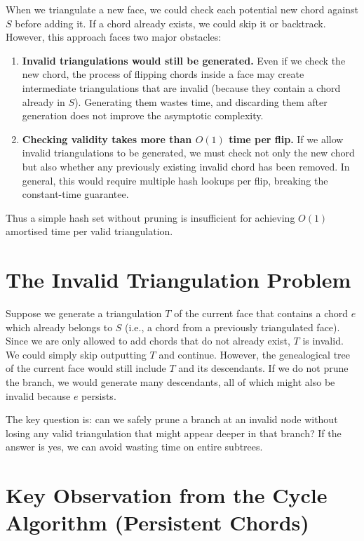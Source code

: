When we triangulate a new face, we could check each potential new chord against \(S\) before adding it. 
If a chord already exists, we could skip it or backtrack. 
However, this approach faces two major obstacles:

\begin{enumerate}
    \item \textbf{Invalid triangulations would still be generated.} 
    Even if we check the new chord, the process of flipping chords inside a face may create intermediate triangulations that are invalid (because they contain a chord already in \(S\)). 
    Generating them wastes time, and discarding them after generation does not improve the asymptotic complexity.
    
    \item \textbf{Checking validity takes more than \(O(1)\) time per flip.} 
    If we allow invalid triangulations to be generated, we must check not only the new chord but also whether any previously existing invalid chord has been removed. 
    In general, this would require multiple hash lookups per flip, breaking the constant-time guarantee.
\end{enumerate}

Thus a simple hash set without pruning is insufficient for achieving \(O(1)\) amortised time per valid triangulation.

\section{The Invalid Triangulation Problem}
\label{sec:invalid_problem}

Suppose we generate a triangulation \(T\) of the current face that contains a chord \(e\) which already belongs to \(S\) (i.e., a chord from a previously triangulated face). 
Since we are only allowed to add chords that do not already exist, \(T\) is invalid. 
We could simply skip outputting \(T\) and continue. 
However, the genealogical tree of the current face would still include \(T\) and its descendants. 
If we do not prune the branch, we would generate many descendants, all of which might also be invalid because \(e\) persists.

The key question is: can we safely prune a branch at an invalid node without losing any valid triangulation that might appear deeper in that branch? 
If the answer is yes, we can avoid wasting time on entire subtrees.

\section{Key Observation from the Cycle Algorithm (Persistent Chords)}
\label{sec:persistent_chords}

